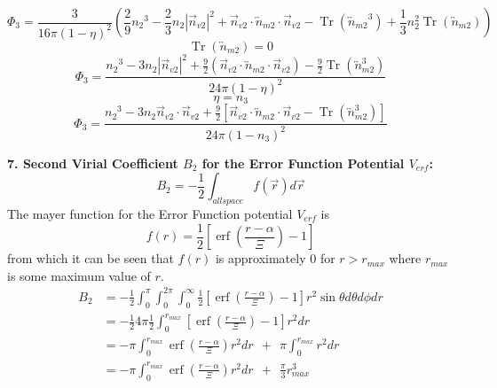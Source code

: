 \documentclass[double,12pt]{beavtex}
\begin{document}
\[{}\]
\begin{equation}{\Phi_3=\frac{3}{16\pi(1-\eta)^2}\left(\frac{2}{9}{n_2}^3-\frac{2}{3}n_2|\vec{n}_{v2}|^2+\vec{n}_{v2}\cdot{\overleftrightarrow{n}_{m2}}\cdot{\vec{n}_{v2}}-\operatorname{Tr}({\overleftrightarrow{n}_{m2}}^3)+\frac{1}{3}n^2_2\operatorname{Tr}(\overleftrightarrow{n}_{m2})\right)}\end{equation} 
\[{}\]
\begin{equation}{\operatorname{Tr}(\overleftrightarrow{n}_{m2})=0}\end{equation} 
\[{}\]
\begin{equation}{\Phi_3=\frac{{n_2}^3-3n_2|\vec{n}_{v2}|^2+\frac{9}{2}(\vec{n}_{v2}\cdot{\overleftrightarrow{n}_{m2}}\cdot{\vec{n}_{v2}})-\frac{9}{2}\operatorname{Tr}({\overleftrightarrow{n}^3_{m2}})}{24\pi(1-\eta)^2}}\end{equation} 
\[{}\]
\begin{equation}{\eta=n_3}\end{equation} 
\[{}\]
\begin{equation}{\Phi_3=\frac{{n_2}^3-3n_2\vec{n}_{v2}\cdot\vec{n}_{v2}+\frac{9}{2}[\vec{n}_{v2}\cdot{\overleftrightarrow{n}_{m2}}\cdot{\vec{n}_{v2}}-\operatorname{Tr}({\overleftrightarrow{n}^3_{m2}})]}{24\pi(1-n_3)^2}}\end{equation} 
\[{}\]
\[{}\]

\textbf{7. Second Virial Coefficient $B_{2}$ for the Error Function Potential $V_{erf}$:}
\begin{equation}B_2=-\frac{1}{2}\int_{allspace}f(\vec{r})d\vec r\end{equation}
The mayer function for the Error Function potential $V_{erf}$ is
\begin{equation}f(r)=\frac{1}{2}\left[\operatorname{erf}\left(\frac{r-\alpha}{\Xi}\right)-1\right]\end{equation} from which it can be seen that $f(r)$ is approximately 0 for $r>r_{max}$ where $r_{max}$ is some maximum value of $r$.
\begin{align}
 B_2 &= -\frac{1}{2}\int_0^{\pi}\int_0^{2\pi}\int_0^\infty\frac{1}{2}\left[\operatorname{erf}\left(\frac{r-\alpha}{\Xi}\right)-1\right]r^2\sin{\theta}d{\theta}d{\phi}dr \\
     &= -\frac{1}{2}4\pi\frac{1}{2}\int_{0}^{r_{max}}\left[\operatorname{erf}\left(\frac{r-\alpha}{\Xi}\right)-1\right]r^2dr \\
     &= -\pi\int_{0}^{r_{max}}\operatorname{erf}\left(\frac{r-\alpha}{\Xi}\right)r^2dr {~~}+{~~} \pi\int_0^{r_{max}}r^2dr   \\
     &= -\pi\int_{0}^{r_{max}}\operatorname{erf}\left(\frac{r-\alpha}{\Xi}\right)r^2dr {~~}+{~~} \frac{\pi}{3}r_{max}^3   
\end{align}
\end{document}
